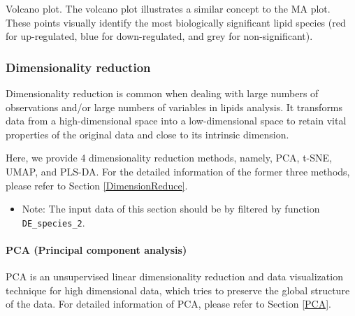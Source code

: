 \documentclass[]{article}
\providecommand{\tightlist}{%
  \setlength{\itemsep}{0pt}\setlength{\parskip}{0pt}}
\begin{document}
\label{fig:unnamed-chunk-19}Volcano plot. The volcano plot illustrates a similar concept to the MA plot. These points visually identify the most biologically significant lipid species (red for up-regulated, blue for down-regulated, and grey for non-significant).

\hypertarget{DEdimensionReduce}{%
\subsubsection{Dimensionality reduction}\label{DEdimensionReduce}}

Dimensionality reduction is common when dealing with large numbers of observations and/or large numbers of variables in lipids analysis. It transforms data from a high-dimensional space into a low-dimensional space to retain vital properties of the original data and close to its intrinsic dimension.

Here, we provide 4 dimensionality reduction methods, namely, PCA, t-SNE, UMAP, and PLS-DA. For the detailed information of the former three methods, please refer to Section \ref{DimensionReduce}.

\begin{itemize}
\tightlist
\item
  Note: The input data of this section should be by filtered by function \texttt{DE\_species\_2}.
\end{itemize}

\hypertarget{pca-principal-component-analysis}{%
\paragraph{PCA (Principal component analysis)}\label{pca-principal-component-analysis}}

PCA is an unsupervised linear dimensionality reduction and data visualization technique for high dimensional data, which tries to preserve the global structure of the data. For detailed information of PCA, please refer to Section \ref{PCA}.
\end{document}
